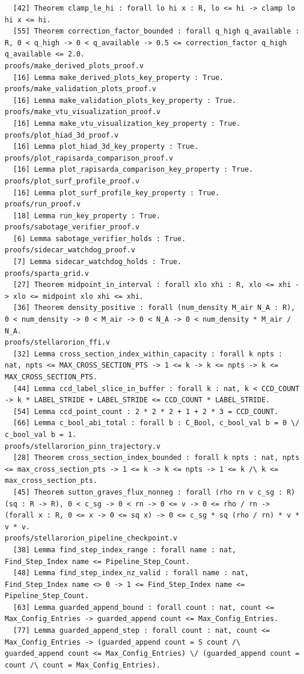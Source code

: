 \documentclass[11pt]{article}
\theoremstyle{definition}
\begin{document}
\begin{verbatim}
  [42] Theorem clamp_le_hi : forall lo hi x : R, lo <= hi -> clamp lo hi x <= hi.
  [55] Theorem correction_factor_bounded : forall q_high q_available : R, 0 < q_high -> 0 < q_available -> 0.5 <= correction_factor q_high q_available <= 2.0.
proofs/make_derived_plots_proof.v
  [16] Lemma make_derived_plots_key_property : True.
proofs/make_validation_plots_proof.v
  [16] Lemma make_validation_plots_key_property : True.
proofs/make_vtu_visualization_proof.v
  [16] Lemma make_vtu_visualization_key_property : True.
proofs/plot_hiad_3d_proof.v
  [16] Lemma plot_hiad_3d_key_property : True.
proofs/plot_rapisarda_comparison_proof.v
  [16] Lemma plot_rapisarda_comparison_key_property : True.
proofs/plot_surf_profile_proof.v
  [16] Lemma plot_surf_profile_key_property : True.
proofs/run_proof.v
  [18] Lemma run_key_property : True.
proofs/sabotage_verifier_proof.v
  [6] Lemma sabotage_verifier_holds : True.
proofs/sidecar_watchdog_proof.v
  [7] Lemma sidecar_watchdog_holds : True.
proofs/sparta_grid.v
  [27] Theorem midpoint_in_interval : forall xlo xhi : R, xlo <= xhi -> xlo <= midpoint xlo xhi <= xhi.
  [36] Theorem density_positive : forall (num_density M_air N_A : R), 0 < num_density -> 0 < M_air -> 0 < N_A -> 0 < num_density * M_air / N_A.
proofs/stellarorion_ffi.v
  [32] Lemma cross_section_index_within_capacity : forall k npts : nat, npts <= MAX_CROSS_SECTION_PTS -> 1 <= k -> k <= npts -> k <= MAX_CROSS_SECTION_PTS.
  [44] Lemma ccd_label_slice_in_buffer : forall k : nat, k < CCD_COUNT -> k * LABEL_STRIDE + LABEL_STRIDE <= CCD_COUNT * LABEL_STRIDE.
  [54] Lemma ccd_point_count : 2 * 2 * 2 + 1 + 2 * 3 = CCD_COUNT.
  [66] Lemma c_bool_abi_total : forall b : C_Bool, c_bool_val b = 0 \/ c_bool_val b = 1.
proofs/stellarorion_pinn_trajectory.v
  [28] Theorem cross_section_index_bounded : forall k npts : nat, npts <= max_cross_section_pts -> 1 <= k -> k <= npts -> 1 <= k /\ k <= max_cross_section_pts.
  [45] Theorem sutton_graves_flux_nonneg : forall (rho rn v c_sg : R) (sq : R -> R), 0 < c_sg -> 0 < rn -> 0 <= v -> 0 <= rho / rn -> (forall x : R, 0 <= x -> 0 <= sq x) -> 0 <= c_sg * sq (rho / rn) * v * v * v.
proofs/stellarorion_pipeline_checkpoint.v
  [38] Lemma find_step_index_range : forall name : nat, Find_Step_Index name <= Pipeline_Step_Count.
  [48] Lemma find_step_index_nz_valid : forall name : nat, Find_Step_Index name <> 0 -> 1 <= Find_Step_Index name <= Pipeline_Step_Count.
  [63] Lemma guarded_append_bound : forall count : nat, count <= Max_Config_Entries -> guarded_append count <= Max_Config_Entries.
  [77] Lemma guarded_append_step : forall count : nat, count <= Max_Config_Entries -> (guarded_append count = S count /\ guarded_append count <= Max_Config_Entries) \/ (guarded_append count = count /\ count = Max_Config_Entries).

\end{verbatim}
\end{document}
